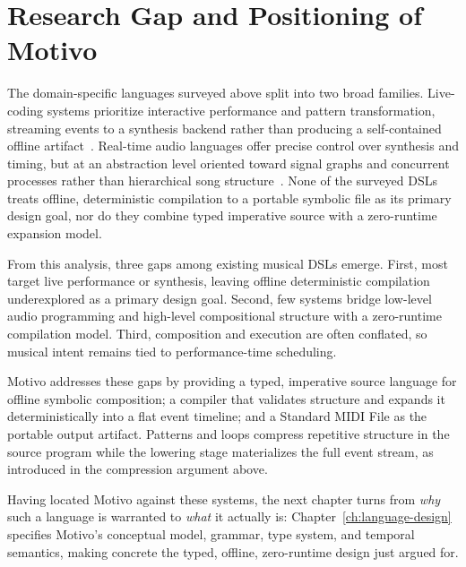 \section{Research Gap and Positioning of Motivo}\label{sec:motivo-position}

The domain-specific languages surveyed above split into two broad families.
Live-coding systems prioritize interactive performance and pattern transformation, streaming events to a synthesis
backend rather than producing a self-contained offline artifact~\cite{Aaron_2016,McLean_Wiggins_2010,Roos_McLean_2023,
Du_Bois_Ribeiro_2019}.
Real-time audio languages offer precise control over synthesis and timing, but at an abstraction level oriented
toward signal graphs and concurrent processes rather than hierarchical song
structure~\cite{Wang_Cook_2003,McCartney_2002}.
None of the surveyed DSLs treats offline, deterministic compilation to a portable symbolic file as its primary design
goal, nor do they combine typed imperative source with a zero-runtime expansion model.

From this analysis, three gaps among existing musical DSLs emerge.
First, most target live performance or synthesis, leaving offline deterministic compilation underexplored as a primary
design goal.
Second, few systems bridge low-level audio programming and high-level compositional structure with a zero-runtime
compilation model.
Third, composition and execution are often conflated, so musical intent remains tied to performance-time scheduling.

Motivo addresses these gaps by providing a typed, imperative source language for offline symbolic composition;
a compiler that validates structure and expands it deterministically into a flat event timeline; and a Standard MIDI
File as the portable output artifact.
Patterns and loops compress repetitive structure in the source program while the lowering stage materializes the full
event stream, as introduced in the compression argument above.

Having located Motivo against these systems, the next chapter turns from \emph{why} such a language is warranted to
\emph{what} it actually is: Chapter~\ref{ch:language-design} specifies Motivo's conceptual model, grammar, type system,
and temporal semantics, making concrete the typed, offline, zero-runtime design just argued for.
